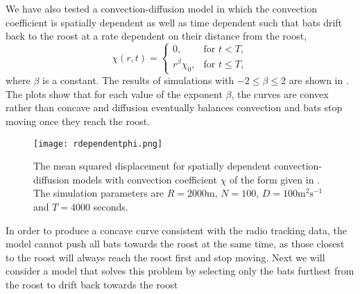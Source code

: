 We have also tested a convection-diffusion model in which the convection coefficient is spatially dependent as well as time dependent such that bats drift back to the roost at a rate dependent on their distance from the roost,
%
\begin{equation}
\chi (r,t) =  \begin{cases}
    0, & \text{for } t < T, \\
    r^{\beta}\chi_0, & \text{for } t \leq T,
  \end{cases}
  \label{eqn:r_dependentchi}
\end{equation}
%
where $\beta$ is a constant. The results of simulations with $ -2 \leq \beta \leq 2$ are shown in . The plots show that for each value of the exponent $\beta$, the curves are convex rather than concave and diffusion eventually balances convection and bats stop moving once they reach the roost.
%
\begin{figure} [h]
    \centering
        \texttt{[image: rdependentphi.png]}
        \caption{The mean squared displacement for spatially dependent convection-diffusion models with convection coefficient $\chi$ of the form given in . The simulation parameters are $R = 2000$m, $N = 100$,
        $D = 100\mathrm{m^2s^{-1}}$ and $T = 4000$ seconds.}
    \label{fig:rdependentphi}
\end{figure}
%

 In order to produce a concave curve consistent with the radio tracking data, the model cannot push all bats towards the roost at the same time, as those closest to the roost will always reach the roost first and stop moving. Next we will consider a model that solves this problem by selecting only the bats furthest from the roost to drift back towards the roost

